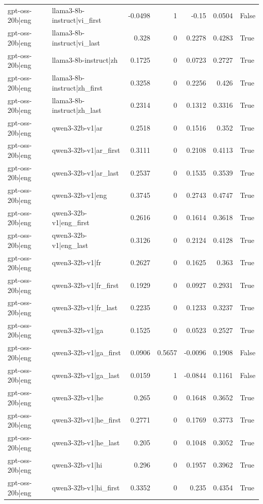 \begin{table}
\begin{tabular}{l l r r r r l}
gpt-oss-20b|eng & llama3-8b-instruct|vi_first & -0.0498 & 1 & -0.15 & 0.0504 & False \\
gpt-oss-20b|eng & llama3-8b-instruct|vi_last & 0.328 & 0 & 0.2278 & 0.4283 & True \\
gpt-oss-20b|eng & llama3-8b-instruct|zh & 0.1725 & 0 & 0.0723 & 0.2727 & True \\
gpt-oss-20b|eng & llama3-8b-instruct|zh_first & 0.3258 & 0 & 0.2256 & 0.426 & True \\
gpt-oss-20b|eng & llama3-8b-instruct|zh_last & 0.2314 & 0 & 0.1312 & 0.3316 & True \\
gpt-oss-20b|eng & qwen3-32b-v1|ar & 0.2518 & 0 & 0.1516 & 0.352 & True \\
gpt-oss-20b|eng & qwen3-32b-v1|ar_first & 0.3111 & 0 & 0.2108 & 0.4113 & True \\
gpt-oss-20b|eng & qwen3-32b-v1|ar_last & 0.2537 & 0 & 0.1535 & 0.3539 & True \\
gpt-oss-20b|eng & qwen3-32b-v1|eng & 0.3745 & 0 & 0.2743 & 0.4747 & True \\
gpt-oss-20b|eng & qwen3-32b-v1|eng_first & 0.2616 & 0 & 0.1614 & 0.3618 & True \\
gpt-oss-20b|eng & qwen3-32b-v1|eng_last & 0.3126 & 0 & 0.2124 & 0.4128 & True \\
gpt-oss-20b|eng & qwen3-32b-v1|fr & 0.2627 & 0 & 0.1625 & 0.363 & True \\
gpt-oss-20b|eng & qwen3-32b-v1|fr_first & 0.1929 & 0 & 0.0927 & 0.2931 & True \\
gpt-oss-20b|eng & qwen3-32b-v1|fr_last & 0.2235 & 0 & 0.1233 & 0.3237 & True \\
gpt-oss-20b|eng & qwen3-32b-v1|ga & 0.1525 & 0 & 0.0523 & 0.2527 & True \\
gpt-oss-20b|eng & qwen3-32b-v1|ga_first & 0.0906 & 0.5657 & -0.0096 & 0.1908 & False \\
gpt-oss-20b|eng & qwen3-32b-v1|ga_last & 0.0159 & 1 & -0.0844 & 0.1161 & False \\
gpt-oss-20b|eng & qwen3-32b-v1|he & 0.265 & 0 & 0.1648 & 0.3652 & True \\
gpt-oss-20b|eng & qwen3-32b-v1|he_first & 0.2771 & 0 & 0.1769 & 0.3773 & True \\
gpt-oss-20b|eng & qwen3-32b-v1|he_last & 0.205 & 0 & 0.1048 & 0.3052 & True \\
gpt-oss-20b|eng & qwen3-32b-v1|hi & 0.296 & 0 & 0.1957 & 0.3962 & True \\
gpt-oss-20b|eng & qwen3-32b-v1|hi_first & 0.3352 & 0 & 0.235 & 0.4354 & True \\

\end{tabular}
\end{table}
